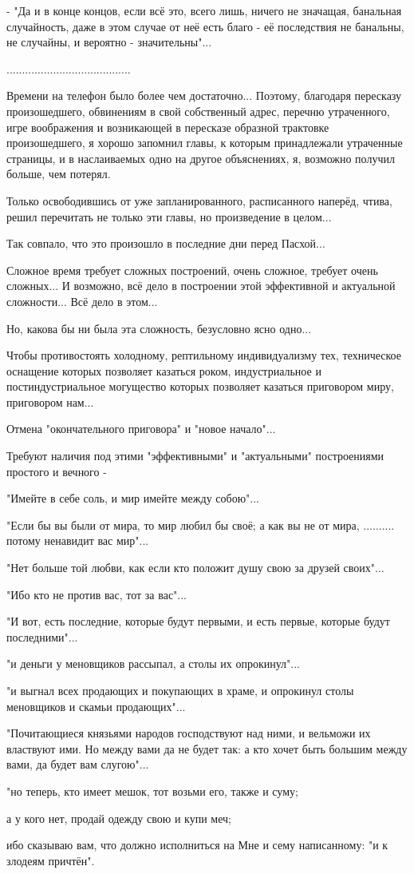 - "Да и в конце концов, если всё это, всего лишь, ничего не значащая, банальная
случайность, даже в этом случае от неё есть благо - её последствия не банальны,
не случайны, и вероятно - значительны"...

........................................

Времени на телефон было более чем достаточно... Поэтому, благодаря пересказу
произошедшего, обвинениям в свой собственный адрес, перечню утраченного, игре
воображения и возникающей в пересказе образной трактовке произошедшего, я
хорошо запомнил главы, к которым принадлежали утраченные страницы, и в
наслаиваемых одно на другое объяснениях, я, возможно получил больше, чем
потерял.

Только освободившись от уже запланированного, расписанного наперёд, чтива,
решил перечитать не только эти главы, но произведение в целом...

Так совпало, что это произошло в последние дни перед Пасхой...

Сложное время требует сложных построений, очень сложное, требует очень
сложных... И возможно, всё дело в построении этой эффективной и актуальной
сложности... Всё дело в этом...

Но, какова бы ни была эта сложность, безусловно ясно одно...

Чтобы противостоять холодному, рептильному индивидуализму тех, техническое
оснащение которых позволяет казаться роком, индустриальное и постиндустриальное
могущество которых позволяет казаться приговором миру, приговором нам...

Отмена "окончательного приговора" и "новое начало"...

Требуют наличия под этими "эффективными" и "актуальными" построениями простого
и вечного -

"Имейте в себе соль, и мир имейте между собою"...

"Если бы вы были от мира, то мир любил бы своё; а как вы не от мира, ..........
потому ненавидит вас мир"...

"Нет больше той любви, как если кто положит душу свою за друзей своих"...

"Ибо кто не против вас, тот за вас"...

"И вот, есть последние, которые будут первыми, и есть первые, которые будут
последними"...

"и деньги у меновщиков рассыпал, а столы их опрокинул"...

"и выгнал всех продающих и покупающих в храме, и опрокинул столы меновщиков и
скамьи продающих"...

"Почитающиеся князьями народов господствуют над ними, и вельможи их властвуют
ими. Но между вами да не будет так: а кто хочет быть большим между вами, да
будет вам слугою"...

"но теперь, кто имеет мешок, тот возьми его, также и суму; 

а у кого нет, продай одежду свою и купи меч; 

ибо сказываю вам, что должно исполниться на Мне и сему написанному: "и к
злодеям причтён".
